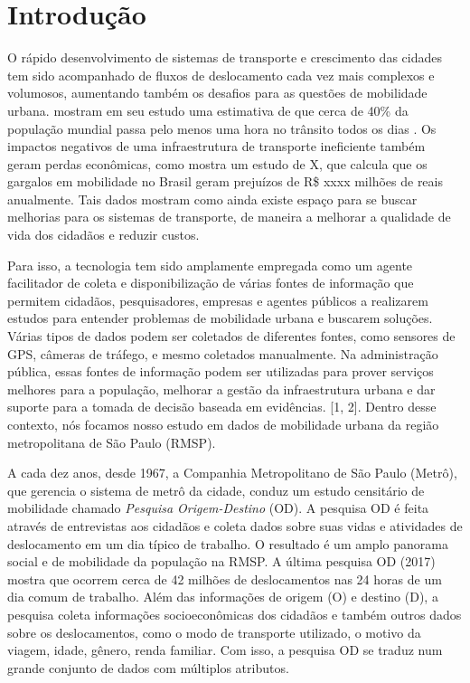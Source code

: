 \chapter{Introdução}
\label{cap:introducao}

O rápido  desenvolvimento de sistemas de transporte e crescimento das cidades
tem sido acompanhado de fluxos de deslocamento cada vez mais complexos e
volumosos, aumentando também os desafios para as questões de mobilidade urbana. 
\cite{Zhang2011} mostram em seu estudo uma estimativa de que cerca de 40\% da população mundial passa pelo menos uma
hora no trânsito todos os dias \citep{Zhang2011}. Os impactos negativos de
uma infraestrutura de transporte ineficiente também geram perdas econômicas,
como mostra um estudo de X, que calcula que
os gargalos em mobilidade no Brasil geram prejuízos de R\$ xxxx milhões de
reais anualmente. Tais dados mostram como ainda existe espaço para se buscar
melhorias para os sistemas de transporte, de maneira
a melhorar a qualidade de vida dos cidadãos e reduzir custos.

Para isso, a tecnologia tem sido amplamente empregada como um agente
facilitador de coleta e disponibilização de várias fontes de informação que
permitem cidadãos, pesquisadores, empresas e agentes públicos a realizarem
estudos para entender problemas de mobilidade urbana e buscarem soluções.
Várias tipos de dados podem ser coletados de diferentes fontes, como sensores
de GPS, câmeras de tráfego, e mesmo coletados manualmente. Na administração
pública, essas fontes de informação podem ser utilizadas para prover serviços
melhores para a população, melhorar a gestão da infraestrutura urbana e dar
suporte para a tomada de decisão baseada em evidências. [1, 2].  Dentro desse
contexto, nós focamos nosso estudo em dados de mobilidade urbana da região
metropolitana de S\~ao Paulo (RMSP).

A cada dez anos, desde 1967, a Companhia Metropolitano de São Paulo (Metrô),
que gerencia o sistema de metrô da cidade, conduz um estudo censitário de
mobilidade chamado \emph{Pesquisa Origem-Destino} (OD). A pesquisa OD é feita
através de entrevistas aos cidadãos e coleta dados sobre suas vidas e
atividades de deslocamento em um dia típico de trabalho. O resultado é um amplo
panorama social e de mobilidade da população na RMSP. A última pesquisa OD
(2017) mostra que ocorrem cerca de 42 milhões de deslocamentos nas 24 horas de
um dia comum de trabalho. Além das informações de origem (O) e destino (D), a
pesquisa coleta informações socioeconômicas dos cidadãos e também outros dados
sobre os deslocamentos, como o modo de transporte utilizado, o motivo da
viagem, idade, gênero, renda familiar. Com isso, a pesquisa OD se traduz num
grande conjunto de dados com múltiplos atributos.

